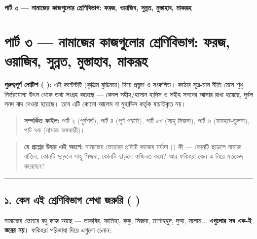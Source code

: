 

\begin{center}{\Large\bfseries\color{emerald} পার্ট ৩ — নামাজের কাজগুলোর শ্রেণিবিভাগ: ফরজ, ওয়াজিব, সুন্নত, মুস্তাহাব, মাকরূহ}\end{center}
\vspace{1em}
\section*{পার্ট ৩ — নামাজের কাজগুলোর শ্রেণিবিভাগ: ফরজ, ওয়াজিব, সুন্নত, মুস্তাহাব, মাকরূহ}

\begin{warnbox}
 \textbf{গুরুত্বপূর্ণ নোটিশ ( ):} এই কন্টেন্টটি  (কৃত্রিম বুদ্ধিমত্তা) দিয়ে প্রস্তুত ও সংকলিত।  কঠোর সূত্র-মান নীতি মেনে শুধু নির্ভরযোগ্য উৎস থেকে তথ্য সংগ্রহ করেছে — কেবল সহীহ/হাসান হাদিস ও সহীহ সনদের আসার রাখা হয়েছে, দুর্বল সনদ বাদ দেওয়া হয়েছে। তবে এটি কোনো আলেম বা মুহাদ্দিস কর্তৃক যাচাইকৃত নয়।
\end{warnbox}

\begin{quote}
\textbf{সম্পর্কিত ফাইল:} পার্ট ২ (পূর্বশর্ত), পার্ট ৪ (পূর্ণ পদ্ধতি), পার্ট ৫খ (সাহু সিজদা), পার্ট ৬ (মাযহাব-তুলনা), পার্ট ৭ক (নামাজ ভঙ্গকারী)।
\end{quote}

\begin{quote}
\textbf{যে প্রশ্নের উত্তর এই অংশে:} নামাজের ভেতরের প্রতিটি কাজের মর্যাদা () কী — কোনটি ছাড়লে নামাজ বাতিল, কোনটি ছাড়লে সাহু সিজদা, কোনটি ছাড়লে ফজিলত কমে? আর ফকিহরা কেন এ নিয়ে মতভেদ করেছেন?
\end{quote}

\medskip\hrule\medskip

\subsection*{১. কেন এই শ্রেণিবিভাগ শেখা জরুরি (  )}

নামাজের ভেতরে বহু কাজ আছে — তাকবির, ফাতিহা, রুকু, সিজদা, তাশাহহুদ, দুআ, সালাম... \textbf{এগুলোর সব এক-ই স্তরের নয়।} ফকিহরা পরিভাষা দিয়ে এগুলো চেনান:

